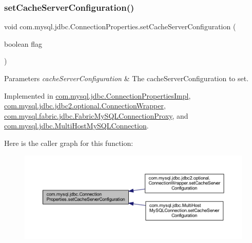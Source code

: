 \subsubsection{\texorpdfstring{set\+Cache\+Server\+Configuration()}{setCacheServerConfiguration()}}
{\footnotesize\ttfamily void com.\+mysql.\+jdbc.\+Connection\+Properties.\+set\+Cache\+Server\+Configuration (\begin{DoxyParamCaption}\item[{boolean}]{flag }\end{DoxyParamCaption})}


\begin{DoxyParams}{Parameters}
{\em cache\+Server\+Configuration} & The cache\+Server\+Configuration to set. \\
\hline
\end{DoxyParams}


Implemented in \mbox{\hyperlink{classcom_1_1mysql_1_1jdbc_1_1_connection_properties_impl_ad075e2f2ac85a7afcd76647027b10b3f}{com.\+mysql.\+jdbc.\+Connection\+Properties\+Impl}}, \mbox{\hyperlink{classcom_1_1mysql_1_1jdbc_1_1jdbc2_1_1optional_1_1_connection_wrapper_acae485e2428a7a687985cf493daa6dc1}{com.\+mysql.\+jdbc.\+jdbc2.\+optional.\+Connection\+Wrapper}}, \mbox{\hyperlink{classcom_1_1mysql_1_1fabric_1_1jdbc_1_1_fabric_my_s_q_l_connection_proxy_a6b6a1ccd6ab8f96f4d24702659774ab4}{com.\+mysql.\+fabric.\+jdbc.\+Fabric\+My\+S\+Q\+L\+Connection\+Proxy}}, and \mbox{\hyperlink{classcom_1_1mysql_1_1jdbc_1_1_multi_host_my_s_q_l_connection_a0e3c4d032287df8965fe62da0755c244}{com.\+mysql.\+jdbc.\+Multi\+Host\+My\+S\+Q\+L\+Connection}}.

Here is the caller graph for this function\+:\nopagebreak
\begin{figure}[H]
\begin{center}
\leavevmode
\includegraphics[width=350pt]{interfacecom_1_1mysql_1_1jdbc_1_1_connection_properties_a1c4d96777532b47bfa433c3083557cae_icgraph}
\end{center}
\end{figure}
\mbox{\label{interfacecom_1_1mysql_1_1jdbc_1_1_connection_properties_ab22fc3c53b2a21bf9064036222219e22}} 
